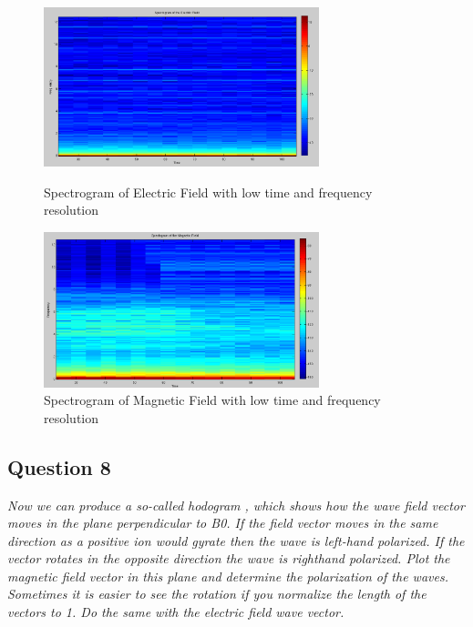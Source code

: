 \documentclass{article}
\begin{document}
\begin{figure}[htb!]
\begin{minipage}[c]{0.5\linewidth}
\centering
\includegraphics[width=8cm]{Figures/spectrogram_electricLR.png}
\caption{Spectrogram of Electric Field with low time and frequency resolution}
\label{fig:spectrogram_electricLR}
\end{minipage}
\hspace{0.1cm}
\begin{minipage}[c]{0.5\linewidth}
\centering
\includegraphics[width=8cm]{Figures/spectrogram_magneticLR.png}
\caption{Spectrogram of Magnetic Field with low time and frequency resolution}
\label{fig:spectrogram_magneticLR}
\end{minipage}
\end{figure}

\subsection{Question 8}
\textit{Now we can produce a so-called hodogram , which shows how the wave field vector moves in the plane perpendicular to B0. If the field vector moves in the same direction as a positive ion would gyrate then the wave is left-hand polarized. If the vector rotates in the opposite direction the wave is righthand polarized. Plot the magnetic field vector in this plane and determine the polarization of the waves. Sometimes it is easier to see the rotation if you normalize the length of the vectors to 1. Do the same with the electric field wave vector.}\\
\end{document}
